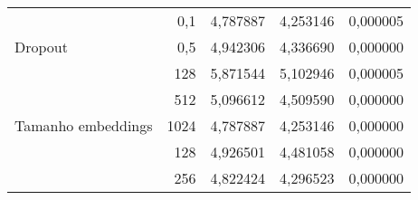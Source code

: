 \begin{table}[]
{\begin{tabular}{lr|rrr}
            \multicolumn{1}{l|}{}                                                                                     & 0,1                                                                          & \multicolumn{1}{r|}{\cellcolor[HTML]{FFF5E1}4,787887}                       & \multicolumn{1}{r|}{\cellcolor[HTML]{FFF5E1}4,253146}            & 0,000005                         \\
            \multicolumn{1}{l|}{\multirow{-2}{*}{Dropout}}                                                            & 0,5                                                                          & \multicolumn{1}{r|}{4,942306}                                               & \multicolumn{1}{r|}{4,336690}                                    & \cellcolor[HTML]{FFF5E1}0,000000 \\ \hline
            \multicolumn{1}{l|}{}                                                                                     & 128                                                                          & \multicolumn{1}{r|}{5,871544}                                               & \multicolumn{1}{r|}{5,102946}                                    & 0,000005                         \\
            \multicolumn{1}{l|}{}                                                                                     & 512                                                                          & \multicolumn{1}{r|}{5,096612}                                               & \multicolumn{1}{r|}{4,509590}                                    & \cellcolor[HTML]{FFF5E1}0,000000 \\
            \multicolumn{1}{l|}{\multirow{-3}{*}{Tamanho embeddings}}                                                 & 1024                                                                         & \multicolumn{1}{r|}{\cellcolor[HTML]{FFF5E1}4,787887}                       & \multicolumn{1}{r|}{\cellcolor[HTML]{FFF5E1}4,253146}            & 0,000000                         \\ \hline
            \multicolumn{1}{l|}{}                                                                                     & 128                                                                          & \multicolumn{1}{r|}{4,926501}                                               & \multicolumn{1}{r|}{4,481058}                                    & 0,000000                         \\
            \multicolumn{1}{l|}{}                                                                                     & 256                                                                          & \multicolumn{1}{r|}{4,822424}                                               & \multicolumn{1}{r|}{4,296523}                                    & 0,000000                         \\

\end{tabular}}
\end{table}
